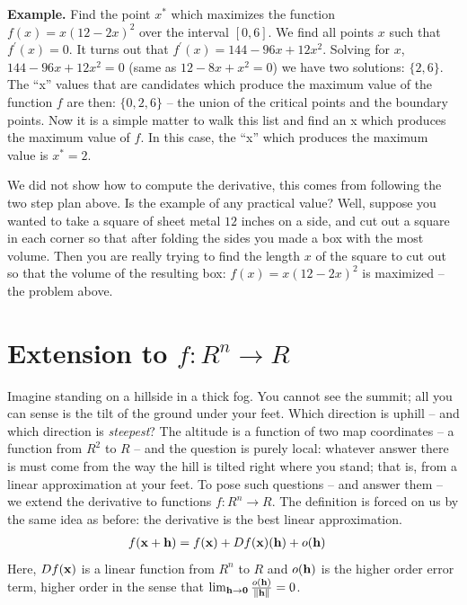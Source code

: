\documentclass{article}
\begin{document}
{\bf Example.} Find the point $x^*$ which maximizes the function $f(x) = x(12 - 2x)^2$
over the interval $[0,6]$. We find all points $x$ such that $f^\prime(x) = 0$.
It turns out that $f^\prime(x) = 144 - 96x + 12x^2$. Solving for $x$,
$144 - 96x + 12x^2 = 0$ (same as $12 - 8x + x^2 = 0$) we have two solutions: $\{2, 6\}$.
The ``x''{} values that are candidates which produce the maximum value of the function $f$
are then: $\{0, 2, 6\}$ -- the union of the critical points and the boundary points.
Now it is a simple matter to walk this list and find an x which produces the maximum
value of $f$. In this case, the ``x''{} which produces the maximum value is $x^* = 2$.

We did not show how to compute the derivative, this comes from following the two
step plan above. Is the example of any practical value? Well, suppose you wanted
to take a square of sheet metal $12$ inches on a side, and cut out a square in each
corner so that after folding the sides you made a box with the most volume. Then
you are really trying to find the length $x$ of the square to cut out so that the
volume of the resulting box: $f(x) = x(12 - 2 x)^2$ is maximized -- the problem
above.




\section{Extension to $f:R^n \rightarrow R$}
Imagine standing on a hillside in a thick fog. You cannot see the summit;
all you can sense is the tilt of the ground under your feet. Which
direction is uphill -- and which direction is {\em steepest\/}? The
altitude is a function of two map coordinates -- a function from $R^2$ to
$R$ -- and the question is purely local: whatever answer there is must
come from the way the hill is tilted right where you stand; that is, from
a linear approximation at your feet. To pose such questions -- and answer
them -- we extend the derivative to functions $f: R^n \rightarrow R$. The
definition is forced on us by the same idea as before: the derivative is
the best linear approximation.
\begin{align}
  f({\bf x} + {\bf h}) &= f({\bf x}) + Df({\bf x})({\bf h}) + o({\bf h}) \label{vderdef}
\end{align}
Here, $Df({\bf x})$ is a linear function from $R^n$ to $R$ and
$o({\bf h})$ is the higher order error term, higher order in the sense that
$\lim_{{\bf h} \rightarrow {\bf 0}}\frac{o({\bf h})}{\|{\bf h}\|} = 0$.
\end{document}
